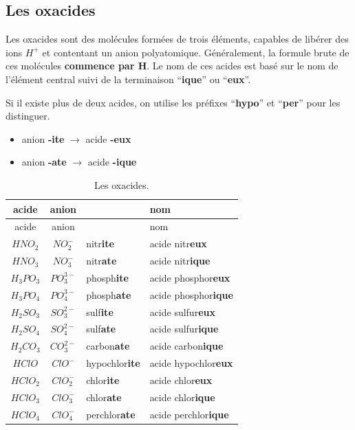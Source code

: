 \documentclass[
  11pt,
  french,
  a4paper,
  openany]{book}
\providecommand{\tightlist}{%
  \setlength{\itemsep}{0pt}\setlength{\parskip}{0pt}}
\begin{document}
\hypertarget{les-oxacides}{%
\subsection{Les oxacides}\label{les-oxacides}}

Les oxacides sont des molécules formées de trois éléments, capables de libérer des ions \(H^+\) et contentant un anion polyatomique. Généralement, la formule brute de ces molécules \textbf{commence par H}. Le nom de ces acides est basé sur le nom de l'élément central suivi de la terminaison ``\textbf{ique}'' ou ``\textbf{eux}''.

Si il existe plus de deux acides, on utilise les préfixes ``\textbf{hypo}'' et ``\textbf{per}'' pour les distinguer.

\begin{itemize}
\tightlist
\item
  anion \textbf{-ite} \(\longrightarrow\) acide \textbf{-eux}
\item
  anion \textbf{-ate} \(\longrightarrow\) acide \textbf{-ique}
\end{itemize}

\newpage

\begin{longtable}[]{@{}ccll@{}}
\caption{\label{tab:oxacides} Les oxacides.}\tabularnewline
\toprule
acide & anion & & nom\tabularnewline
\midrule
\endfirsthead
\toprule
acide & anion & & nom\tabularnewline
\midrule
\endhead
\(HNO_2\) & \(NO_2^{-}\) & nitr\textbf{ite} & acide nitr\textbf{eux}\tabularnewline
\(HNO_3\) & \(NO_3^{-}\) & nitr\textbf{ate} & acide nitr\textbf{ique}\tabularnewline
\(H_3PO_3\) & \(PO_3^{3-}\) & phosph\textbf{ite} & acide phosphor\textbf{eux}\tabularnewline
\(H_3PO_4\) & \(PO_4^{3-}\) & phosph\textbf{ate} & acide phosphor\textbf{ique}\tabularnewline
\(H_2SO_3\) & \(SO_3^{2-}\) & sulf\textbf{ite} & acide sulfur\textbf{eux}\tabularnewline
\(H_2SO_4\) & \(SO_4^{2-}\) & sulf\textbf{ate} & acide sulfur\textbf{ique}\tabularnewline
\(H_2CO_3\) & \(CO_3^{2-}\) & carbon\textbf{ate} & acide carbon\textbf{ique}\tabularnewline
\(HClO\) & \(ClO^{-}\) & hypochlor\textbf{ite} & acide hypochlor\textbf{eux}\tabularnewline
\(HClO_2\) & \(ClO_2^{-}\) & chlor\textbf{ite} & acide chlor\textbf{eux}\tabularnewline
\(HClO_3\) & \(ClO_3^{-}\) & chlor\textbf{ate} & acide chlor\textbf{ique}\tabularnewline
\(HClO_4\) & \(ClO_4^{-}\) & perchlor\textbf{ate} & acide perchlor\textbf{ique}\tabularnewline
\bottomrule
\end{longtable}
\end{document}
